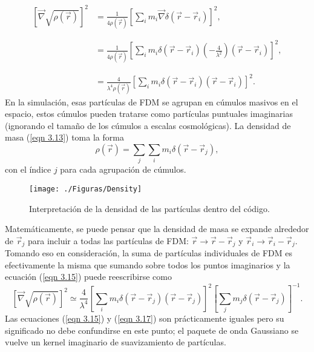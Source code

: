 \documentclass[a4paper,openright,12pt]{book}
\begin{document}
\begin{equation}
\begin{array}{ll}
\left[\vec{\nabla}\sqrt{\rho (\vec{r})}\right]^{2} &=
\frac{1}{4\rho(\vec{r})}\left[\sum_{i} m_{i}\vec{\nabla}\delta(\vec{r}-\vec{r}_{i})\right]^{2}, \\\\\\ 
&=
\frac{1}{4\rho(\vec{r})} 
\left[\sum_{i}
m_{i}\delta(\vec{r}-\vec{r}_{i})(-\frac{4}{\lambda^{2}})(\vec{r}-\vec{r}_{i})\right]^{2}, \\\\\\
&=
\frac{4}{\lambda^{4}\rho(\vec{r})}
\left[
\sum_{i} m_{i}\delta(\vec{r}-\vec{r}_{i})(\vec{r}-\vec{r}_{i})
\right]^{2}. \label{eqn 3.15}

\end{array}
\end{equation}
En la simulación, esas partículas de FDM se agrupan en cúmulos masivos en el espacio, estos cúmulos pueden tratarse como partículas puntuales imaginarias (ignorando el tamaño de los cúmulos a escalas cosmológicas). La densidad de masa (\ref{eqn 3.13}) toma la forma
\begin{equation}
\rho(\vec{r})
=
\sum_{j}\sum_{i}m_{i}\delta(\vec{r}-\vec{r}_{j}),\label{eqn 3.16}
\end{equation} 
con el índice $j$ para cada agrupación de cúmulos. 

\begin{figure}
\centering
\texttt{[image: ./Figuras/Density]}
\caption{\footnotesize{Interpretación de la densidad de las partículas dentro del código.}}
\end{figure}

Matemáticamente, se puede pensar que la densidad de masa se expande alrededor de $\vec{r}_{j}$ para incluir a todas las partículas de FDM: $\vec{r} \rightarrow \vec{r}-\vec{r}_{j}$ y $\vec{r}_{i} \rightarrow \vec{r}_{i} - \vec{r}_{j}$. Tomando eso en consideración, la suma de partículas individuales de FDM es efectivamente la misma que sumando sobre todos los puntos imaginarios y la ecuación (\ref{eqn 3.15}) puede reescribirse como 
\begin{equation}
\left[\vec{\nabla}\sqrt{\rho (\vec{r})}\right]^{2} \simeq 
\frac{4}{\lambda^{4}}
\left[
\sum_{i}m_{i}\delta(\vec{r}-\vec{r}_{j})(\vec{r}-\vec{r}_{j})
\right]^{2}
\left[
\sum_{j}m_{j}\delta(\vec{r}-\vec{r}_{j})
\right]^{-1}. \label{eqn 3.17}
\end{equation}
Las ecuaciones (\ref{eqn 3.15}) y (\ref{eqn 3.17}) son prácticamente iguales pero su significado no debe confundirse en este punto; el paquete de onda Gaussiano se vuelve un kernel imaginario de suavizamiento de partículas.
\end{document}
